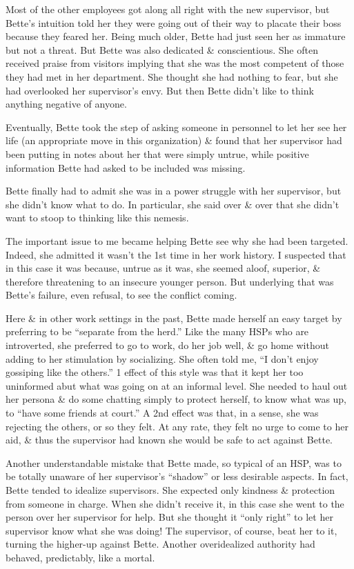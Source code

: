 \documentclass{article}
\numberwithin{equation}{section}
\begin{document}
Most of the other employees got along all right with the new supervisor, but Bette's intuition told her they were going out of their way to placate their boss because they feared her. Being much older, Bette had just seen her as immature but not a threat. But Bette was also dedicated \& conscientious. She often received praise from visitors implying that she was the most competent of those they had met in her department. She thought she had nothing to fear, but she had overlooked her supervisor's envy. But then Bette didn't like to think anything negative of anyone.

Eventually, Bette took the step of asking someone in personnel to let her see her life (an appropriate move in this organization) \& found that her supervisor had been putting in notes about her that were simply untrue, while positive information Bette had asked to be included was missing.

Bette finally had to admit she was in a power struggle with her supervisor, but she didn't know what to do. In particular, she said over \& over that she didn't want to stoop to thinking like this nemesis.

The important issue to me became helping Bette see why she had been targeted. Indeed, she admitted it wasn't the 1st time in her work history. I suspected that in this case it was because, untrue as it was, she seemed aloof, superior, \& therefore threatening to an insecure younger person. But underlying that was Bette's failure, even refusal, to see the conflict coming.

Here \& in other work settings in the past, Bette made herself an easy target by preferring to be ``separate from the herd.'' Like the many HSPs who are introverted, she preferred to go to work, do her job well, \& go home without adding to her stimulation by socializing. She often told me, ``I don't enjoy gossiping like the others.'' 1 effect of this style was that it kept her too uninformed abut what was going on at an informal level. She needed to haul out her persona \& do some chatting simply to protect herself, to know what was up, to ``have some friends at court.'' A 2nd effect was that, in a sense, she was rejecting the others, or so they felt. At any rate, they felt no urge to come to her aid, \& thus the supervisor had known she would be safe to act against Bette.

Another understandable mistake that Bette made, so typical of an HSP, was to be totally unaware of her supervisor's ``shadow'' or less desirable aspects. In fact, Bette tended to idealize supervisors. She expected only kindness \& protection from someone in charge. When she didn't receive it, in this case she went to the person over her supervisor for help. But she thought it ``only right'' to let her supervisor know what she was doing! The supervisor, of course, beat her to it, turning the higher-up against Bette. Another overidealized authority had behaved, predictably, like a mortal.
\end{document}
